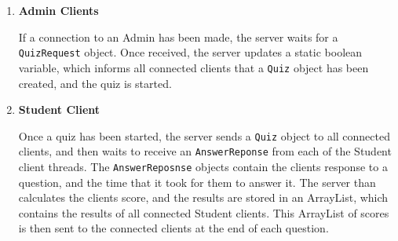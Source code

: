 \begin{enumerate}
	\item \textbf{Admin Clients}

	If a connection to an Admin has been made, the server waits for a
	\texttt{QuizRequest} object. Once received, the server updates a static
	boolean variable, which informs all connected clients that a \texttt{Quiz}
	object has been created, and the quiz is started.

	\item \textbf{Student Client}

	Once a quiz has been started, the server sends a \texttt{Quiz} object to
	all connected clients, and then waits to receive an \texttt{AnswerReponse}
	from each of the Student client threads. The \texttt{AnswerReposnse}
	objects contain the clients response to a question, and the time that it
	took for them to answer it.  The server than calculates the clients score,
	and the results are stored in an ArrayList, which contains the results of
	all connected Student clients.  This ArrayList of scores is then sent to
	the connected clients at the end of each question.

\end{enumerate}
